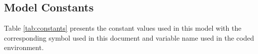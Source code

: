\subsection{Model Constants}
\label{sec:constants}
Table \ref{tab:constants} presents the constant values used in this model with the corresponding symbol used in this document and variable name used in the coded environment. 

